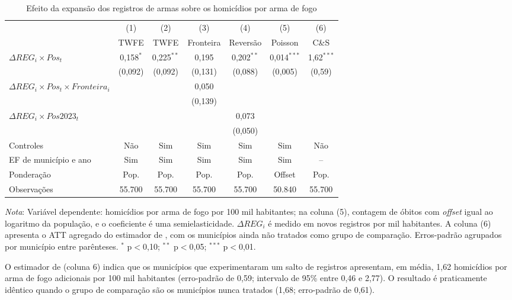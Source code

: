 \documentclass[11pt,a4paper]{article}
\newcommand{\nota}[1]{\par\vspace{2pt}\begin{minipage}{\linewidth}\footnotesize\textit{Nota}: #1\end{minipage}}
\begin{document}
\begin{table}[H]
\centering\footnotesize\setlength{\tabcolsep}{4pt}
\caption{Efeito da expansão dos registros de armas sobre os homicídios por arma de fogo}\label{tab:main}
\begin{tabular}{lcccccc}
\toprule
 & (1) & (2) & (3) & (4) & (5) & (6) \\
 & TWFE & TWFE & Fronteira & Reversão & Poisson & C\&S \\
\midrule
$\Delta REG_i \times Pos_t$ & 0{,}158$^{*}$ & 0{,}225$^{**}$ & 0{,}195 & 0{,}202$^{**}$ & 0{,}014$^{***}$ & 1{,}62$^{***}$ \\
 & (0{,}092) & (0{,}092) & (0{,}131) & (0{,}088) & (0{,}005) & (0{,}59) \\
$\Delta REG_i \times Pos_t \times Fronteira_i$ &  &  & 0{,}050 &  &  &  \\
 &  &  & (0{,}139) &  &  &  \\
$\Delta REG_i \times Pos2023_t$ &  &  &  & 0{,}073 &  &  \\
 &  &  &  & (0{,}050) &  &  \\
\midrule
Controles & Não & Sim & Sim & Sim & Sim & Não \\
EF de município e ano & Sim & Sim & Sim & Sim & Sim & -- \\
Ponderação & Pop. & Pop. & Pop. & Pop. & Offset & Pop. \\
Observações & 55.700 & 55.700 & 55.700 & 55.700 & 50.840 & 55.700 \\
\bottomrule
\end{tabular}
\nota{Variável dependente: homicídios por arma de fogo por 100 mil habitantes; na coluna (5), contagem de óbitos com \textit{offset} igual ao logaritmo da população, e o coeficiente é uma semielasticidade. $\Delta REG_i$ é medido em novos registros por mil habitantes. A coluna (6) apresenta o ATT agregado do estimador de \citet{callaway2021}, com os municípios ainda não tratados como grupo de comparação. Erros-padrão agrupados por município entre parênteses. $^{*}$ p$<$0,10; $^{**}$ p$<$0,05; $^{***}$ p$<$0,01.}
\end{table}

O estimador de \citet{callaway2021} (coluna 6) indica que os municípios que experimentaram um salto de registros apresentam, em média, 1{,}62 homicídios por arma de fogo adicionais por 100 mil habitantes (erro-padrão de 0{,}59; intervalo de 95\% entre 0{,}46 e 2{,}77). O resultado é praticamente idêntico quando o grupo de comparação são os municípios nunca tratados (1{,}68; erro-padrão de 0{,}61).
\end{document}
